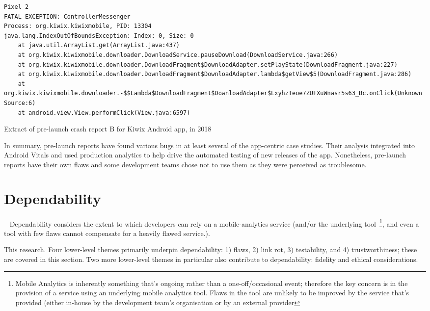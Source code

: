 \begin{listing}
\begin{verbatim}
Pixel 2
FATAL EXCEPTION: ControllerMessenger
Process: org.kiwix.kiwixmobile, PID: 13304
java.lang.IndexOutOfBoundsException: Index: 0, Size: 0
	at java.util.ArrayList.get(ArrayList.java:437)
	at org.kiwix.kiwixmobile.downloader.DownloadService.pauseDownload(DownloadService.java:266)
	at org.kiwix.kiwixmobile.downloader.DownloadFragment$DownloadAdapter.setPlayState(DownloadFragment.java:227)
	at org.kiwix.kiwixmobile.downloader.DownloadFragment$DownloadAdapter.lambda$getView$5(DownloadFragment.java:286)
	at org.kiwix.kiwixmobile.downloader.-$$Lambda$DownloadFragment$DownloadAdapter$LxyhzTeoe7ZUFXuWnasr5s63_Bc.onClick(Unknown Source:6)
	at android.view.View.performClick(View.java:6597)
\end{verbatim}
\caption{Extract of pre-launch crash report B for Kiwix Android app, in 2018}
\label{listing:kiwix-pre-launch-report-crash-report-b}
\end{listing}

In summary, pre-launch reports have found various bugs in at least several of the app-centric case studies. Their analysis integrated into Android Vitals and used production analytics to help drive the automated testing of new releases of the app. Nonetheless, pre-launch reports have their own flaws and some development teams chose not to use them as they were perceived as troublesome. 


\section{Dependability}~\label{section-dependability}
Dependability considers the extent to which developers can rely on a mobile-analytics service (and/or the underlying tool~\footnote{Mobile Analytics is inherently something that's ongoing rather than a one-off/occasional event; therefore the key concern is in the provision of a service using an underlying mobile analytics tool. Flaws in the tool are unlikely to be improved by the service that's provided (either in-house by the development team's organisation or by an external provider}, and even a tool with few flaws cannot compensate for a heavily flawed service.). 

This research. Four lower-level themes primarily underpin dependability: 1) flaws, 2) link rot, 3) testability, and 4) trustworthiness; these are covered in this section. Two more lower-level themes in particular also contribute to dependability: fidelity and ethical considerations. 


